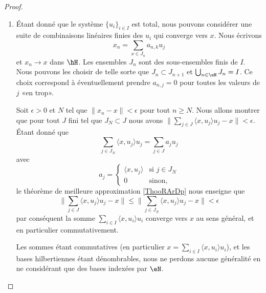 \begin{proof}
    \begin{enumerate}
        \item
            Étant donné que le système \( \{ u_i \}_{i\in I}\) est total, nous pouvons considérer une suite de combinaisons linéaires finies des \( u_i\) qui converge vers \( x\). Nous écrivons
            \begin{equation}
                x_n=\sum_{x\in J_n}a_{n,k}u_j
            \end{equation}
            et \( x_n\to x\) dans \( \hH\). Les ensembles \( J_n\) sont des sous-ensembles finis de \( I\). Nous pouvons les choisir de telle sorte que \( J_n\subset J_{n+1}\) et \( \bigcup_{n\in \eN}J_n=I\). Ce choix correspond à éventuellement prendre \( a_{n,j}=0\) pour toutes les valeurs de \( j\) «en trop».

            Soit \( \epsilon>0\) et \( N\) tel que \( \| x_n-x \|<\epsilon\) pour tout \( n\geq N\). Nous allons montrer que pour tout \( J\) fini tel que \( J_N\subset J\) nous avons \( \| \sum_{j\in J}\langle x, u_j\rangle u_j-x \|<\epsilon\). Étant donné que
            \begin{equation}
                \sum_{j\in J_N}\langle x, u_j\rangle u_j=\sum_{j\in J}a_ju_j
            \end{equation}
            avec
            \begin{equation}
                a_j=\begin{cases}
                    \langle x, u_j\rangle     &   \text{si } j\in J_N\\
                    0    &    \text{sinon},
                \end{cases}
            \end{equation}
            le théorème de meilleure approximation \ref{ThooRArDp} nous enseigne que
            \begin{equation}
                \| \sum_{j\in J}\langle x, u_j\rangle u_j-x \|\leq\| \sum_{j\in J_N}\langle x, u_j\rangle u_j-x \|<\epsilon
            \end{equation}
            par conséquent la somme \( \sum_{i\in I}\langle x, u_i\rangle u_i\) converge vers \( x\) au sens général, et en particulier commutativement.

    Les sommes étant commutatives (en particulier \( x=\sum_{i\in I}\langle x, u_i\rangle u_i\)), et les bases hilbertiennes étant dénombrables, nous ne perdons aucune généralité en ne considérant que des bases indexées par \( \eN\).


\end{enumerate}
\end{proof}
